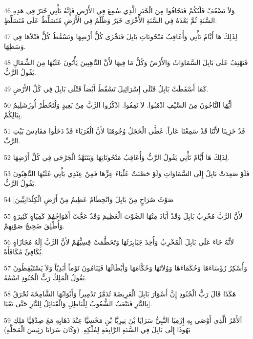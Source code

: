 \par 46 وَلاَ يَضْعُفْ قَلْبُكُمْ فَتَخَافُوا مِنَ الْخَبَرِ الَّذِي سُمِعَ فِي الأَرْضِ فَإِنَّهُ يَأْتِي خَبَرٌ فِي هَذِهِ السَّنَةِ ثُمَّ بَعْدَهُ فِي السَّنَةِ الأُخْرَى خَبَرٌ وَظُلْمٌ فِي الأَرْضِ مُتَسَلِّطٌ عَلَى مُتَسَلِّطٍ.
\par 47 لِذَلِكَ هَا أَيَّامٌ تَأْتِي وَأُعَاقِبُ مَنْحُوتَاتِ بَابِلَ فَتَخْزَى كُلُّ أَرْضِهَا وَتَسْقُطُ كُلُّ قَتْلاَهَا فِي وَسَطِهَا.
\par 48 فَتَهْتِفُ عَلَى بَابِلَ السَّمَاوَاتُ وَالأَرْضُ وَكُلُّ مَا فِيهَا لأَنَّ النَّاهِبِينَ يَأْتُونَ عَلَيْهَا مِنَ الشِّمَالِ يَقُولُ الرَّبُّ.
\par 49 كَمَا أَسْقَطَتْ بَابِلُ قَتْلَى إِسْرَائِيلَ تَسْقُطُ أَيْضاً قَتْلَى بَابِلَ فِي كُلِّ الأَرْضِ.
\par 50 أَيُّهَا النَّاجُونَ مِنَ السَّيْفِ اذْهَبُوا. لاَ تَقِفُوا. اذْكُرُوا الرَّبَّ مِنْ بَعِيدٍ وَلْتَخْطُرْ أُورُشَلِيمُ بِبَالِكُمْ.
\par 51 قَدْ خَزِينَا لأَنَّنَا قَدْ سَمِعْنَا عَاراً. غَطَّى الْخَجَلُ وُجُوهَنَا لأَنَّ الْغُرَبَاءَ قَدْ دَخَلُوا مَقَادِسَ بَيْتِ الرَّبِّ.
\par 52 لِذَلِكَ هَا أَيَّامٌ تَأْتِي يَقُولُ الرَّبُّ وَأُعَاقِبُ مَنْحُوتَاتِهَا وَيَتَنَهَّدُ الْجَرْحَى فِي كُلِّ أَرْضِهَا.
\par 53 فَلَوْ صَعِدَتْ بَابِلُ إِلَى السَّمَاوَاتِ وَلَوْ حَصَّنَتْ عَلْيَاءَ عِزِّهَا فَمِنْ عِنْدِي يَأْتِي عَلَيْهَا النَّاهِبُونَ يَقُولُ الرَّبُّ.
\par 54 [صَوْتُ صُرَاخٍ مِنْ بَابِلَ وَانْحِطَامٌ عَظِيمٌ مِنْ أَرْضِ الْكِلْدَانِيِّينَ
\par 55 لأَنَّ الرَّبَّ مُخْرِبٌ بَابِلَ وَقَدْ أَبَادَ مِنْهَا الصَّوْتَ الْعَظِيمَ وَقَدْ عَجَّتْ أَمْوَاجُهُمْ كَمِيَاهٍ كَثِيرَةٍ وَأُطْلِقَ ضَجِيجُ صَوْتِهِمْ.
\par 56 لأَنَّهُ جَاءَ عَلَى بَابِلَ الْمُخْرِبُ وَأُخِذَ جَبَابِرَتُهَا وَتَحَطَّمَتْ قِسِيُّهُمْ لأَنَّ الرَّبَّ إِلَهُ مُجَازَاةٍ يُكَافِئُ مُكَافَأَةً.
\par 57 وَأُسْكِرُ رُؤَسَاءَهَا وَحُكَمَاءَهَا وَوُلاَتَهَا وَحُكَّامَهَا وَأَبْطَالَهَا فَيَنَامُونَ نَوْماً أَبَدِيّاً وَلاَ يَسْتَيْقِظُونَ يَقُولُ الْمَلِكُ رَبُّ الْجُنُودِ اسْمُهُ.
\par 58 هَكَذَا قَالَ رَبُّ الْجُنُودِ إِنَّ أَسْوَارَ بَابِلَ الْعَرِيضَةَ تُدَمَّرُ تَدْمِيراً وَأَبْوَابُهَا الشَّامِخَةَ تُحْرَقُ بِالنَّارِ فَتَتْعَبُ الشُّعُوبُ لِلْبَاطِلِ وَالْقَبَائِلُ لِلنَّارِ حَتَّى تَعْيَا].
\par 59 اَلأَمْرُ الَّذِي أَوْصَى بِهِ إِرْمِيَا النَّبِيُّ سَرَايَا بْنَ نِيرِيَّا بْنِ مَحْسِيَّا عِنْدَ ذَهَابِهِ مَعَ صِدْقِيَّا مَلِكِ يَهُوذَا إِلَى بَابِلَ فِي السَّنَةِ الرَّابِعَةِ لِمُلْكِهِ. (وَكَانَ سَرَايَا رَئِيسَ الْمَحَلَّةِ)
